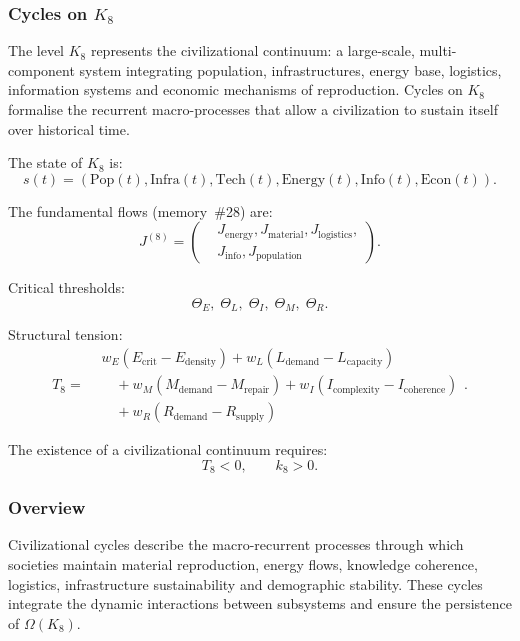 
\subsubsection{Cycles on \texorpdfstring{$K_8$}{K_8}}
\label{sec:cycles-k8}

The level $K_8$ represents the civilizational continuum: a large-scale,
multi-component system integrating population, infrastructures, energy base,
logistics, information systems and economic mechanisms of reproduction.
Cycles on $K_8$ formalise the recurrent macro-processes that allow a
civilization to sustain itself over historical time.

The state of $K_8$ is:
\[
  s(t) = (\text{Pop}(t), \text{Infra}(t), \text{Tech}(t),
           \text{Energy}(t), \text{Info}(t), \text{Econ}(t)).
\]

The fundamental flows (memory~\#28) are:
\[
  J^{(8)} =
  \left(
  \begin{aligned}
   &J_{\mathrm{energy}}, J_{\mathrm{material}}, J_{\mathrm{logistics}},\\
   &J_{\mathrm{info}}, J_{\mathrm{population}}
  \end{aligned}
  \right).
\]

Critical thresholds:
\[
  \Theta_E,\;
  \Theta_L,\;
  \Theta_I,\;
  \Theta_M,\;
  \Theta_R.
\]

Structural tension:
\[
  T_8 = 
  \begin{aligned}
    &w_E(E_{\mathrm{crit}} - E_{\mathrm{density}})
    + w_L(L_{\mathrm{demand}} - L_{\mathrm{capacity}})\\
    &\quad + w_M(M_{\mathrm{demand}} - M_{\mathrm{repair}})
    + w_I(I_{\mathrm{complexity}} - I_{\mathrm{coherence}})\\
    &\quad + w_R(R_{\mathrm{demand}} - R_{\mathrm{supply}})
  \end{aligned}
  .
\]

The existence of a civilizational continuum requires:
\[
  T_8 < 0,\qquad k_8>0.
\]

\subsubsection{Overview}

Civilizational cycles describe the macro-recurrent processes through which
societies maintain material reproduction, energy flows, knowledge coherence,
logistics, infrastructure sustainability and demographic stability.  
These cycles integrate the dynamic interactions between subsystems and ensure
the persistence of $\Omega(K_8)$.

